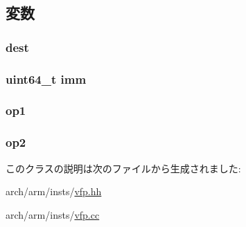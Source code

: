 \subsection{変数}
\hypertarget{classArmISA_1_1FpRegRegRegImmOp_aec72e8e45bdc87abeeeb75d2a8a9a716}{
\subsubsection[{dest}]{ {\bf dest}}}
\label{classArmISA_1_1FpRegRegRegImmOp_aec72e8e45bdc87abeeeb75d2a8a9a716}
\hypertarget{classArmISA_1_1FpRegRegRegImmOp_a2b4406ad2843b5aa12d244d01d8fdc69}{
\subsubsection[{imm}]{\setlength{\rightskip}{0pt plus 5cm}uint64\_\-t {\bf imm}}}
\label{classArmISA_1_1FpRegRegRegImmOp_a2b4406ad2843b5aa12d244d01d8fdc69}
\hypertarget{classArmISA_1_1FpRegRegRegImmOp_a4c465c43ad568f8bcf8ae71480e9cfea}{
\subsubsection[{op1}]{ {\bf op1}}}
\label{classArmISA_1_1FpRegRegRegImmOp_a4c465c43ad568f8bcf8ae71480e9cfea}
\hypertarget{classArmISA_1_1FpRegRegRegImmOp_a7799ff6cbe5a252199059eb8665820e7}{
\subsubsection[{op2}]{ {\bf op2}}}
\label{classArmISA_1_1FpRegRegRegImmOp_a7799ff6cbe5a252199059eb8665820e7}


このクラスの説明は次のファイルから生成されました:\begin{DoxyCompactItemize}
\item 
arch/arm/insts/\hyperlink{vfp_8hh}{vfp.hh}\item 
arch/arm/insts/\hyperlink{vfp_8cc}{vfp.cc}\end{DoxyCompactItemize}
